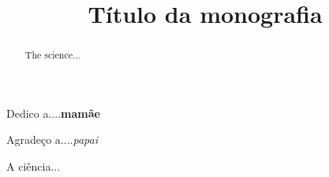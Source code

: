 \documentclass[bacharelado]{unb-cic}
\title{Título da monografia}
\begin{document}
  \maketitle
  \pretextual

  \begin{dedicatoria}
  Dedico a....\textbf{mamãe}
  \end{dedicatoria}

  \begin{agradecimentos}
  Agradeço a....\textit{papai}
  \end{agradecimentos}

  \begin{resumo}
  A ciência...
  \end{resumo}

  \begin{abstract}
  The science...
  \end{abstract}

  \tableofcontents
  \listoffigures
  \listoftables

  \textual
  
  

  \postextual
  
  
\end{document}
